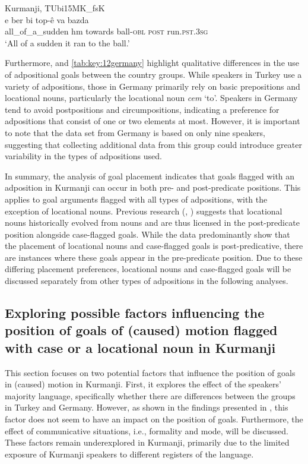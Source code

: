 \ea%
  \label{ex:key:76} Kurmanji, TUbi15MK\_fsK \\
   e   {ber bi}     top-ê     va   bazda  \\
all\_of\_a\_sudden   hm  towards ball\textsc{-obl}  \textsc{post}  run\textsc{.pst.3sg}\\
\glt ‘All of a sudden it ran to the ball.’  
  \z

Furthermore,  and \ref{tab:key:12germany} highlight qualitative differences in the use of adpositional goals between the country groups. While speakers in Turkey use a variety of adpositions, those in Germany primarily rely on basic prepositions and locational nouns, particularly the locational noun \textit{cem} ‘to’. Speakers in Germany tend to avoid postpositions and circumpositions, indicating a preference for adpositions that consist of one or two elements at most. However, it is important to note that the data set from Germany is based on only nine speakers, suggesting that collecting additional data from this group could introduce greater variability in the types of adpositions used.

In summary, the analysis of goal placement indicates that goals flagged with an adposition in Kurmanji can occur in both pre- and post-predicate positions. This applies to goal arguments flagged with all types of adpositions, with the exception of locational nouns. Previous research (\citealt{Haig2014}, \citealt{HaigThiele2014}) suggests that locational nouns historically evolved from nouns and are thus licensed in the post-predicate position alongside case-flagged goals. While the data predominantly show that the placement of locational nouns and case-flagged goals is post-predicative, there are instances where these goals appear in the pre-predicate position. Due to these differing placement preferences, locational nouns and case-flagged goals will be discussed separately from other types of adpositions in the following analyses.

\subsection{Exploring possible factors influencing the position of goals of (caused) motion flagged with case or a locational noun in Kurmanji}\label{sec:key:6.3.2}

This section focuses on two potential factors that influence the position of goals in (caused) motion in Kurmanji. First, it explores the effect of the speakers' majority language, specifically whether there are differences between the groups in Turkey and Germany. However, as shown in the findings presented in , this factor does not seem to have an impact on the position of goals. Furthermore, the effect of communicative situations, i.e., formality and mode, will be discussed. These factors remain underexplored in Kurmanji, primarily due to the limited exposure of Kurmanji speakers to different registers of the language.

